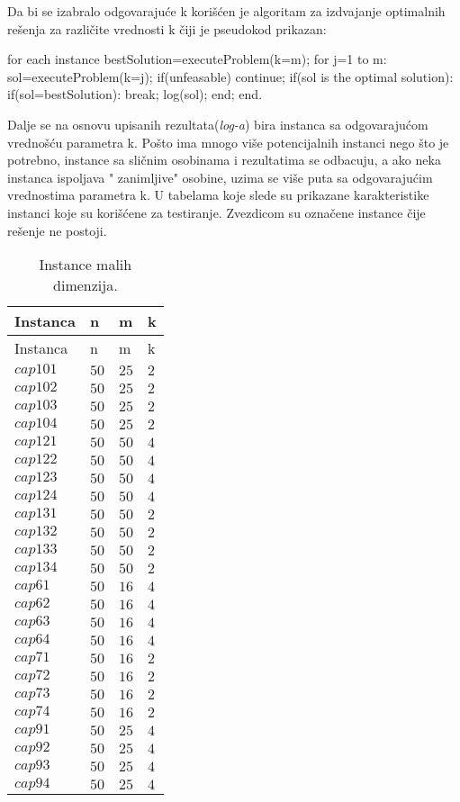 \documentclass[a4paper]{article}
\begin{document}
Da bi se izabralo odgovarajuće k korišćen je algoritam za izdvajanje optimalnih rešenja za različite vrednosti k čiji je pseudokod prikazan:
\begin{algorithm}
for each instance
	bestSolution=executeProblem(k=m);
	for j=1 to m:
		sol=executeProblem(k=j);
		if(unfeasable)
			continue;
		if(sol is the optimal solution):
			if(sol=bestSolution):
				break;
			log(sol);
	end;
end.
\end{algorithm}

Dalje se na osnovu upisanih rezultata(\emph{log-a}) bira instanca sa odgovarajućom vrednošću parametra k. Pošto ima mnogo više potencijalnih instanci nego što je potrebno, instance sa sličnim osobinama i rezultatima se odbacuju, a ako neka instanca ispoljava "{} zanimljive"{ } osobine, uzima se više puta sa odgovarajućim vrednostima parametra k. U tabelama koje slede su prikazane karakteristike instanci koje su korišćene za testiranje. Zvezdicom su označene instance čije rešenje ne postoji.


\begin{longtabu} to 1\textwidth{ X[2] | X  X  X }\caption{Instance malih dimenzija.\label{instancetable}}\\ Instanca & n & m &k \\\hline\endfirsthead\endfoot Instanca & n & m &k \\\hline\endhead\hline\endlastfoot $cap101$& $50$ & $25$ & $2$\\ 
$cap102$& $50$ & $25$ & $2$\\ 
$cap103$& $50$ & $25$ & $2$\\ 
$cap104$& $50$ & $25$ & $2$\\ 
$cap121$& $50$ & $50$ & $4$\\ 
$cap122$& $50$ & $50$ & $4$\\ 
$cap123$& $50$ & $50$ & $4$\\ 
$cap124$& $50$ & $50$ & $4$\\ 
$cap131$& $50$ & $50$ & $2$\\ 
$cap132$& $50$ & $50$ & $2$\\ 
$cap133$& $50$ & $50$ & $2$\\ 
$cap134$& $50$ & $50$ & $2$\\ 
$cap61$& $50$ & $16$ & $4$\\ 
$cap62$& $50$ & $16$ & $4$\\ 
$cap63$& $50$ & $16$ & $4$\\ 
$cap64$& $50$ & $16$ & $4$\\ 
$cap71$& $50$ & $16$ & $2$\\ 
$cap72$& $50$ & $16$ & $2$\\ 
$cap73$& $50$ & $16$ & $2$\\ 
$cap74$& $50$ & $16$ & $2$\\ 
$cap91$& $50$ & $25$ & $4$\\ 
$cap92$& $50$ & $25$ & $4$\\ 
$cap93$& $50$ & $25$ & $4$\\ 
$cap94$& $50$ & $25$ & $4$\\ 
\end{longtabu}
\end{document}
